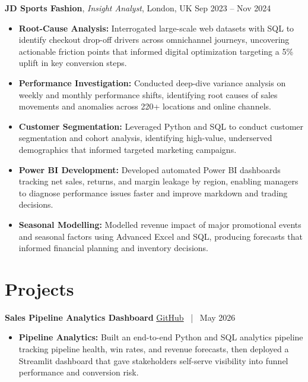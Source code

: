 \documentclass[10pt, a4paper]{article}
\begin{document}
\vspace{4pt}

\textbf{JD Sports Fashion}, \textit{Insight Analyst}, London, UK \hfill Sep 2023 -- Nov 2024
\begin{itemize}
    \item \textbf{Root-Cause Analysis:} Interrogated large-scale web datasets with SQL to identify checkout drop-off drivers across omnichannel journeys, uncovering actionable friction points that informed digital optimization targeting a 5\% uplift in key conversion steps.
    \item \textbf{Performance Investigation:} Conducted deep-dive variance analysis on weekly and monthly performance shifts, identifying root causes of sales movements and anomalies across 220+ locations and online channels.
    \item \textbf{Customer Segmentation:} Leveraged Python and SQL to conduct customer segmentation and cohort analysis, identifying high-value, underserved demographics that informed targeted marketing campaigns.
    \item \textbf{Power BI Development:} Developed automated Power BI dashboards tracking net sales, returns, and margin leakage by region, enabling managers to diagnose performance issues faster and improve markdown and trading decisions.
    \item \textbf{Seasonal Modelling:} Modelled revenue impact of major promotional events and seasonal factors using Advanced Excel and SQL, producing forecasts that informed financial planning and inventory decisions.
\end{itemize}

\section*{Projects}

\textbf{Sales Pipeline Analytics Dashboard} \hfill \href{https://github.com/VishalP44/sales-pipeline-analytics}{GitHub} \, | \, May 2026
\begin{itemize}
    \item \textbf{Pipeline Analytics:} Built an end-to-end Python and SQL analytics pipeline tracking pipeline health, win rates, and revenue forecasts, then deployed a Streamlit dashboard that gave stakeholders self-serve visibility into funnel performance and conversion risk.
\end{itemize}

\vspace{4pt}
\end{document}
